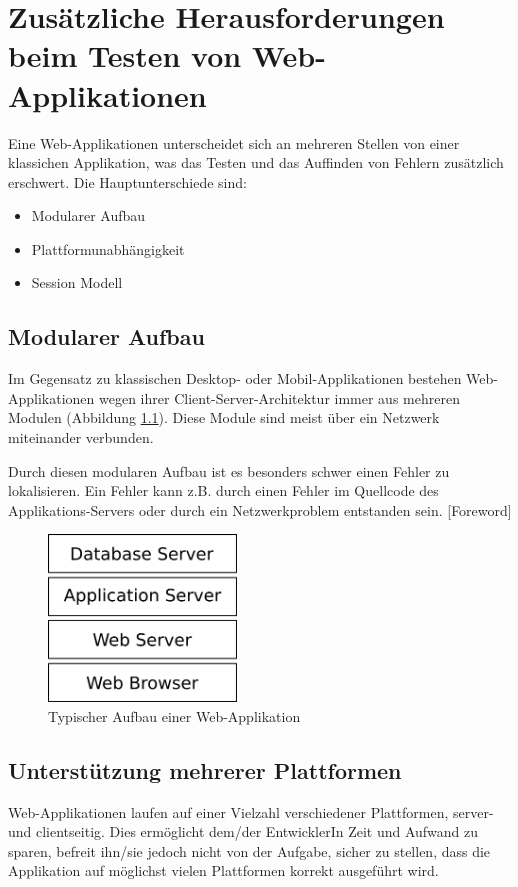 \documentclass[a4paper,bibtotoc,oneside]{scrbook}
\begin{document}
\chapter{Zusätzliche Herausforderungen beim Testen von Web-Applikationen}
Eine Web-Applikationen unterscheidet sich an mehreren Stellen von einer klassichen Applikation, was das Testen und das Auffinden von Fehlern zusätzlich erschwert. Die Hauptunterschiede sind:

\begin{itemize}
	\item Modularer Aufbau
	\item Plattformunabhängigkeit
	\item Session Modell
\end{itemize}


\section{Modularer Aufbau}

Im Gegensatz zu klassischen Desktop- oder Mobil-Applikationen bestehen Web-Applikationen wegen ihrer Client-Server-Architektur immer aus mehreren Modulen (Abbildung \ref{Abb4}). Diese Module sind meist über ein Netzwerk miteinander verbunden.

Durch diesen modularen Aufbau ist es besonders schwer einen Fehler zu lokalisieren. Ein Fehler kann z.B. durch einen Fehler im Quellcode des Applikations-Servers oder durch ein Netzwerkproblem entstanden sein. \cite{testing_apps_on_web}[Foreword]

\begin{figure}[h!]
\centering
\includegraphics[width=50mm]{img/webstack.png}
\caption[Typischer Aufbau einer Web-Applikation]{Typischer Aufbau einer Web-Applikation}\label{Abb4}
\end{figure}

\section{Unterstützung mehrerer Plattformen}
Web-Applikationen laufen auf einer Vielzahl verschiedener Plattformen, server- und clientseitig. Dies ermöglicht dem/der EntwicklerIn Zeit und Aufwand zu sparen, befreit ihn/sie jedoch nicht von der Aufgabe, sicher zu stellen, dass die Applikation auf möglichst vielen Plattformen korrekt ausgeführt wird.
\end{document}
